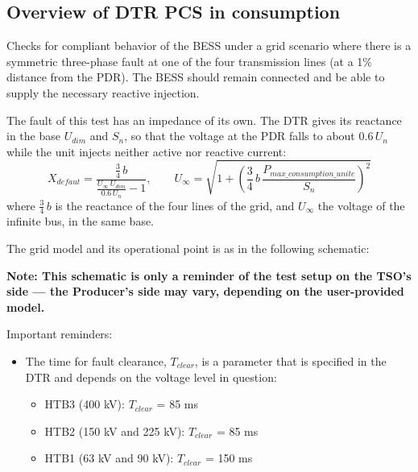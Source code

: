     \subsection{Overview of DTR PCS \DTRPcs{} in consumption}

    Checks for compliant behavior of the BESS under a grid scenario where there
    is a symmetric three-phase fault at one of the four transmission lines
    (at a 1\% distance from the PDR). The BESS should remain connected and
    be able to supply the necessary reactive injection.

    The fault of this test has an impedance of its own. The DTR gives its reactance
    in the base $U_{dim}$ and $S_n$, so that the voltage at the PDR falls to
    about $0.6\,U_n$ while the unit injects neither active nor reactive current:
    \[
        X_{defaut} = \frac{\frac{3}{4}\,b}{\frac{U_\infty\,U_{dim}}{0.6\,U_n} - 1},
        \qquad
        U_\infty = \sqrt{1 + \left(\frac{3}{4}\,b\,\frac{P_{max\_consumption\_unite}}{S_n}\right)^2}
    \]
    where $\frac{3}{4}\,b$ is the reactance of the four lines of the grid, and
    $U_\infty$ the voltage of the infinite bus, in the same base.

    The grid model and its operational point is as in the following schematic:
    \begin{center}
        
    \end{center}
    \begin{center}
        \small \textbf{Note: This schematic is only a reminder of the test setup on the TSO's
        side --- the Producer's side may vary, depending on the user-provided model.}
    \end{center}

    \noindent Important reminders:
    \begin{itemize}
        \item The time for fault clearance, $T_{clear}$, is a parameter that
        is specified in the DTR and depends on the voltage level in
        question:
        \begin{itemize}
            \item HTB3 (400 kV): $T_{clear}$ = 85 ms
            \item HTB2 (150 kV and 225 kV): $T_{clear}$ = 85 ms
            \item HTB1 (63 kV and 90 kV): $T_{clear}$ = 150 ms
        \end{itemize}
    \end{itemize}

